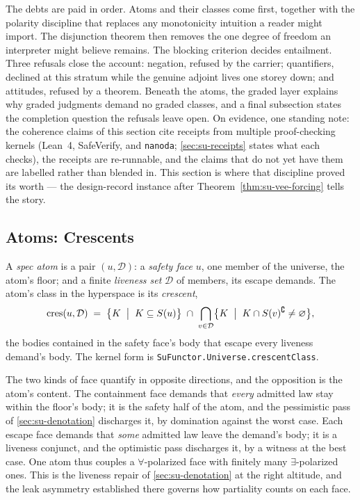 The debts are paid in order. Atoms and their classes come first,
together with the polarity discipline that replaces any
monotonicity intuition a reader might import. The disjunction
theorem then removes the one degree of freedom an interpreter might
believe remains. The blocking criterion decides entailment. Three
refusals close the account: negation, refused by the carrier;
quantifiers, declined at this stratum while the genuine adjoint
lives one storey down; and attitudes, refused by a theorem. Beneath
the atoms, the graded layer explains why graded judgments demand
no graded classes, and a final subsection states the completion
question the refusals leave open. On evidence, one standing note:
the coherence claims of this section cite receipts from multiple
proof-checking kernels (Lean~4, SafeVerify, and \texttt{nanoda};
\autoref{sec:su-receipts} states what each checks), the receipts
are re-runnable, and the claims that do not yet have them are
labelled rather than blended in. This section is where that
discipline proved its worth --- the design-record instance after
Theorem~\ref{thm:su-vee-forcing} tells the story.

\subsection{Atoms: Crescents}

\begin{definition}
\label{def:su-crescent}
A \emph{spec atom} is a pair $(u, \mathcal{D})$: a \emph{safety
face} $u$, one member of the universe, the atom's floor; and a
finite \emph{liveness set} $\mathcal{D}$ of members, its escape
demands. The atom's class in the hyperspace is its \emph{crescent},
\[
  \mathrm{cres}(u, \mathcal{D}) \;=\;
  \bigl\{K \;\bigm|\; K \subseteq S(u)\bigr\} \;\cap\;
  \bigcap_{v \in \mathcal{D}}
  \bigl\{K \;\bigm|\; K \cap S(v)^{\complement} \neq
  \varnothing\bigr\},
\]
the bodies contained in the safety face's body that escape every
liveness demand's body. The kernel form is
\texttt{SuFunctor.Universe.crescentClass}.
\end{definition}

The two kinds of face quantify in opposite directions, and the
opposition is the atom's content. The containment face demands that
\emph{every} admitted law stay within the floor's body; it is the
safety half of the atom, and the pessimistic pass of
\autoref{sec:su-denotation} discharges it, by domination against
the worst case. Each escape face demands that \emph{some} admitted
law leave the demand's body; it is a liveness conjunct, and the
optimistic pass discharges it, by a witness at the best case. One
atom thus couples a $\forall$-polarized face with finitely many
$\exists$-polarized ones. This is the liveness repair of
\autoref{sec:su-denotation} at the right altitude, and the leak
asymmetry established there governs how partiality counts on each
face.

